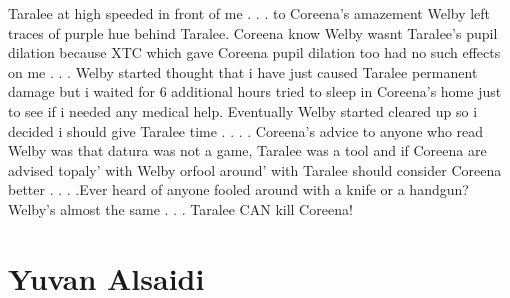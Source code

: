 \documentclass[12pt]{book}
\begin{document}
Taralee at high speeded in front of me . . .  to Coreena's amazement Welby left traces of purple hue behind Taralee. Coreena know Welby wasnt Taralee's pupil dilation because XTC which gave Coreena pupil dilation too had no such effects on me . . .  Welby started thought that i have just caused Taralee permanent damage but i waited for 6 additional hours tried to sleep in Coreena's home just to see if i needed any medical help. Eventually Welby started cleared up so i decided i should give Taralee time . . .  . Coreena's advice to anyone who read Welby was that datura was not a game, Taralee was a tool and if Coreena are advised topaly' with Welby orfool around' with Taralee should consider Coreena better . . .  .Ever heard of anyone fooled around with a knife or a handgun? Welby's almost the same . . .  Taralee CAN kill Coreena!



\chapter{Yuvan Alsaidi}
\end{document}
